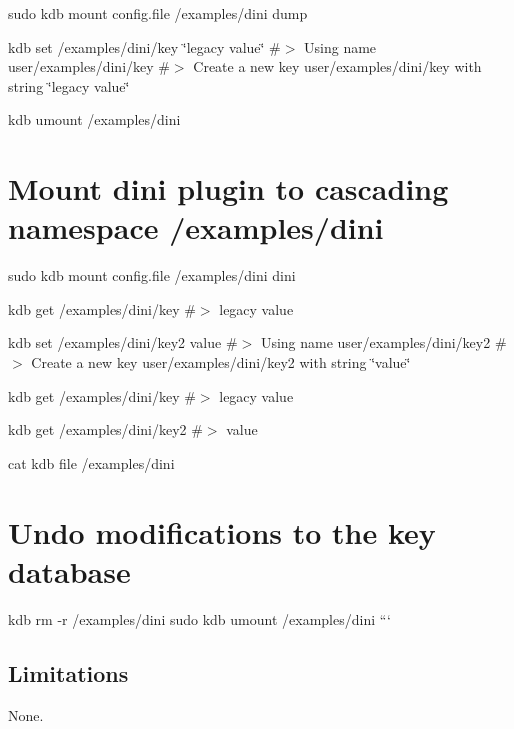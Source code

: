 sudo kdb mount config.\+file /examples/dini dump

kdb set /examples/dini/key \char`\"{}legacy value\char`\"{} \#$>$ Using name user/examples/dini/key \#$>$ Create a new key user/examples/dini/key with string \char`\"{}legacy value\char`\"{}

kdb umount /examples/dini

\section*{Mount dini plugin to cascading namespace {\ttfamily /examples/dini}}

sudo kdb mount config.\+file /examples/dini dini

kdb get /examples/dini/key \#$>$ legacy value

kdb set /examples/dini/key2 value \#$>$ Using name user/examples/dini/key2 \#$>$ Create a new key user/examples/dini/key2 with string \char`\"{}value\char`\"{}

kdb get /examples/dini/key \#$>$ legacy value

kdb get /examples/dini/key2 \#$>$ value

cat {\ttfamily kdb file /examples/dini}

\section*{Undo modifications to the key database}

kdb rm -\/r /examples/dini sudo kdb umount /examples/dini ```

\subsection*{Limitations}

None. 